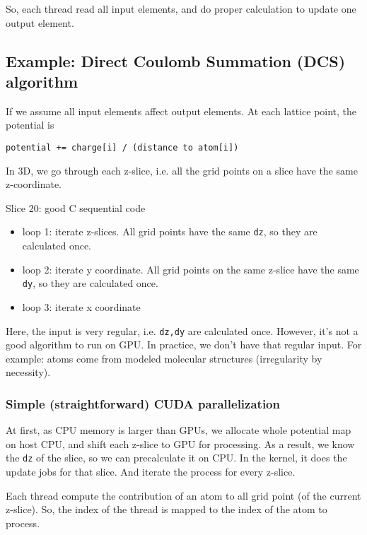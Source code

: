 So, each thread read all input elements, and do proper calculation to
update one output element. 

\subsection{Example: Direct Coulomb Summation (DCS) algorithm}
\label{sec:exampl-direct-coul}

If we assume all input elements affect output elements. At each
lattice point, the potential is
\begin{lstlisting}
potential += charge[i] / (distance to atom[i])
\end{lstlisting}

In 3D, we go through each z-slice, i.e. all the grid points on a slice
have the same z-coordinate. 

Slice 20: good C sequential code
\begin{itemize}
\item loop 1: iterate z-slices. All grid points have the same
  \verb!dz!, so they are calculated once.

\item loop 2: iterate y coordinate. All grid points on the same
  z-slice have the same \verb!dy!, so they are calculated once.

\item loop 3: iterate x coordinate

\end{itemize}
Here, the input is very regular, i.e. \verb!dz,dy! are calculated
once. However, it's not a good algorithm to run on GPU. In practice,
we don't have that regular input. For example: atoms come from modeled
molecular structures (irregularity by necessity).

\subsubsection{Simple (straightforward) CUDA parallelization}
\label{sec:simple-stra-cuda}

At first, as CPU memory is larger than GPUs, we allocate whole
potential map on host CPU, and shift each z-slice to GPU for
processing. As a result, we know the \verb!dz! of the slice, so we can
precalculate it on CPU. In the kernel, it does the update jobs for
that slice. And iterate the process for every z-slice. 

Each thread compute the contribution of an atom to all grid point (of
the current z-slice). So, the index of the thread is mapped to the
index of the atom to process.

